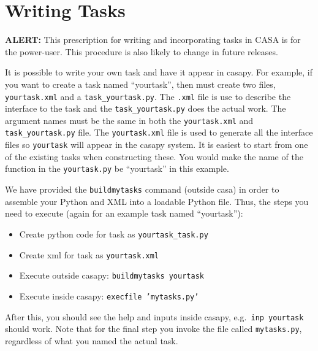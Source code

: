 

\chapter[Appendix: Writing Tasks in CASA]{Writing Tasks}
\label{chapter:write}

{\bf ALERT:} This prescription for writing and incorporating
tasks in CASA is for the power-user.  This procedure is also likely
to change in future releases.

It is possible to write your own task and have it appear in
casapy. For example, if you want to create a task named ``yourtask'',
then must create two files, {\tt yourtask.xml} and a
{\tt task\_yourtask.py}. The {\tt .xml} file is use to describe the interface to
the task and the {\tt task\_yourtask.py} does the actual work.  The argument
names must be the same in both the {\tt yourtask.xml} and {\tt task\_yourtask.py}
file. The {\tt yourtask.xml} file is used to generate all the interface
files so {\tt yourtask} will appear in the casapy system.  It is
easiest to start from one of the existing tasks when constructing
these.  You would make the name of the function in the 
{\tt  yourtask.py} be ``yourtask'' in this example.

We have provided the {\tt buildmytasks} command (outside casa) in order
to assemble your Python and XML into a loadable Python file.  Thus,
the steps you need to execute (again for an example task named ``yourtask''):
\begin{itemize}
\item Create python code for task as {\tt yourtask\_task.py}
\item Create xml for task as {\tt yourtask.xml}
\item Execute outside casapy: {\tt buildmytasks yourtask}
\item Execute inside casapy: {\tt execfile 'mytasks.py'}
\end{itemize}
After this, you should see the help and inputs inside casapy, e.g.\ 
{\tt inp yourtask} should work.  Note that for the final step you
invoke the file called {\tt mytasks.py}, regardless of what you named
the actual task.

